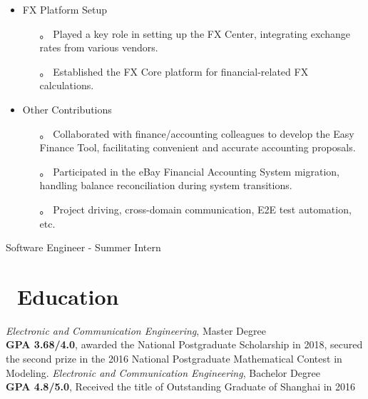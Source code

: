 \documentclass{resume}
\begin{document}
\begin{itemize}
  \item FX Platform Setup
  \begin{itemize}
    \item[。] Played a key role in setting up the FX Center, integrating exchange rates from various vendors.
    \item[。] Established the FX Core platform for financial-related FX calculations.
  \end{itemize}

\item Other Contributions
  \begin{itemize}
    \item[。] Collaborated with finance/accounting colleagues to develop the Easy Finance Tool, facilitating convenient and accurate accounting proposals.
    \item[。] Participated in the eBay Financial Accounting System migration, handling balance reconciliation during system transitions.
    \item[。] Project driving, cross-domain communication, E2E test automation, etc.
  \end{itemize}
\end{itemize}

Software Engineer - Summer Intern

\section{\faGraduationCap\ Education}
\textit{Electronic and Communication Engineering}, Master Degree
\\ \textbf{GPA 3.68/4.0}, awarded the National Postgraduate Scholarship in 2018, secured the second prize in the 2016 National Postgraduate Mathematical Contest in Modeling.
\textit{Electronic and Communication Engineering}, Bachelor Degree
\\ \textbf{GPA 4.8/5.0}, Received the title of Outstanding Graduate of Shanghai in 2016


\end{document}
